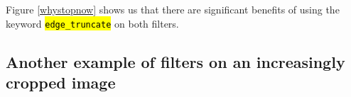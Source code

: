 \documentclass[10pt]{scrartcl}
\begin{document}
   

Figure \ref{whystopnow} shows us that there are significant benefits of using the keyword \hl{\texttt{edge\_truncate}} on both filters.

\subsection{Another example of filters on an increasingly cropped image} %
\label{sub:another_example_of_filters_on_an_increasingly_cropped_image}
\end{document}
